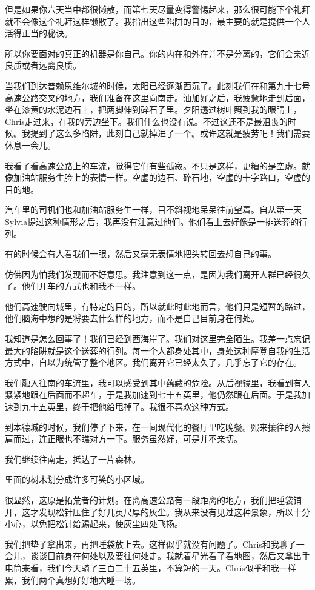 \documentclass[UTF8]{article}
\begin{document}
\par 但是如果你六天当中都很懒散，而第七天尽量变得警惕起来，那么很可能下个礼拜就不会像这个礼拜这样懒散了。我指出这些陷阱的目的，最主要的就是提供一个人活得正当的秘诀。
\par 所以你要面对的真正的机器是你自己。你的内在和外在并不是分离的，它们会亲近良质或者远离良质。
\par 当我们到达普赖恩维尔城的时候，太阳已经逐渐西沉了。此刻我们在和第九十七号高速公路交叉的地方，我们准备在这里向南走。油加好之后，我疲惫地走到后面，坐在漆黄的水泥边石上，把两脚伸到碎石子里。夕阳透过树叶照到我的眼睛上，Chris走过来，在我的旁边坐下。我们什么也没有说。不过这还不是最沮丧的时候。我提到了这么多陷阱，此刻自己就掉进了一个。或许这就是疲劳吧！我们需要休息一会儿。
\par 我看了看高速公路上的车流，觉得它们有些孤寂。不只是这样，更糟的是空虚。就像加油站服务生脸上的表情一样。空虚的边石、碎石地，空虚的十字路口，空虚的目的地。
\par 汽车里的司机们也和加油站服务生一样，目不斜视地呆呆往前望着。自从第一天Sylvia提过这种情形之后，我再没有注意过他们。他们看上去好像是一排送葬的行列。
\par 有的时候会有人看我们一眼，然后又毫无表情地把头转回去想自己的事。
\par 仿佛因为怕我们发现而不好意思。我注意到这一点，是因为我们离开人群已经很久了。他们开车的方式也和我不一样。
\par 他们高速驶向城里，有特定的目的，所以就此时此地而言，他们只是短暂的路过，他们脑海中想的是将要去什么样的地方，而不是自己目前身在何处。
\par 我知道是怎么回事了！我们已经到西海岸了。我们对这里完全陌生。我差一点忘记最大的陷阱就是这个送葬的行列。每一个人都身处其中，身处这种摩登自我的生活方式中，自以为统管了整个地区。我们离开它已经太久了，几乎忘了它的存在。
\par 我们融入往南的车流里，我可以感受到其中蕴藏的危险。从后视镜里，我看到有人紧紧地跟在后面而不超车，于是我加速到七十五英里，他仍然跟在后面。于是我加速到九十五英里，终于把他给甩掉了。我很不喜欢这种方式。
\par 到本德城的时候，我们停了下来，在一间现代化的餐厅里吃晚餐。熙来攘往的人擦肩而过，连正眼也不瞧对方一下。服务虽然好，可是并不亲切。
\par 我们继续往南走，抵达了一片森林。
\par 里面的树木划分成许多可笑的小区域。
\par 很显然，这原是拓荒者的计划。在离高速公路有一段距离的地方，我们把睡袋铺开，这才发现松针压住了好几英尺厚的灰尘。我从来没有见过这种景象，所以十分小心，以免把松针给踢起来，使灰尘四处飞扬。
\par 我们把垫子拿出来，再把睡袋放上去。这样似乎就没有问题了。Chris和我聊了一会儿，谈谈目前身在何处以及要往何处走。我就着星光看了看地图，然后又拿出手电筒来看，我们今天骑了三百二十五英里，不算短的一天。Chris似乎和我一样累，我们两个真想好好地大睡一场。
\end{document}
